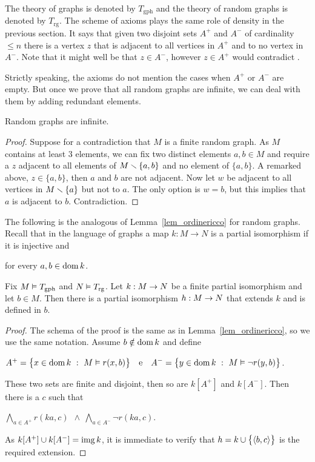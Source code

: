 \documentclass[creche.tex]{subfiles}
\begin{document}
The theory of graphs is denoted by \emph{$T_{\textrm{gph}}$} and the theory of random graphs is denoted by \emph{$T_{\textrm{rg}}$}. The scheme of axioms  plays the same role of density in the previous section.  It says that given two disjoint sets $A^+$ and $A^-$ of cardinality $\le n$ there is a vertex $z$ that is adjacent to all vertices in $A^+$ and to no vertex in $A^-$. Note that it might well be that $z\in A^-$, however $z\in A^+$ would contradict . 

Strictly speaking, the axioms  do not mention the cases when $A^+$ or $A^-$ are empty. But once we prove that all random graphs are infinite, we can deal with them by adding redundant elements.

\begin{proposition}
Random graphs are infinite.
\end{proposition}
\begin{proof}
Suppose for a contradiction that $M$ is a finite random graph. As $M$ contains at least $3$ elements, we can fix two distinct elements $a,b\in M$ and require a $z$ adjacent to all elements of $M\sm\{a,b\}$ and no element of $\{a,b\}$. A remarked above, $z\in\{a,b\}$, then $a$ and $b$ are not adjacent. Now let $w$ be adjacent to all vertices in $M\sm\{a\}$ but not to $a$. The only option is $w=b$, but this implies that $a$ is adjacent to $b$. Contradiction.
\end{proof}

The following is the analogous of Lemma~\ref{lem_ordinericco} for random graphs. Recall that in the language of graphs a map $k:M\to N$ is a partial isomorphism if it is injective and

\hfill for every $a,b\in\dom k$.

\begin{lemma}\label{lem_graforicco}
Fix $M\models T_{\rm gph}$ and $N\models T_{\rm rg}$. Let $k:M\imp N$ be a finite partial isomorphism and let $b\in M$. Then there is a partial isomorphism $h:M\imp N$ that extends $k$ and is defined in $b$.
\end{lemma}
\begin{proof} The schema of the proof is the same as in Lemma~\ref{lem_ordinericco}, so we use the same notation. Assume $b\notin\dom k$ and define\medskip

\hfil$A^+=\big\{x\in\dom k\ :\ M\models r(x,b)\big\}\ \ \ \textrm{e}\ \ \ A^-=\big\{y\in\dom k\ :\  M\models \neg r(y,b)\big\}$.\medskip

These two sets are finite and disjoint, then so are $k[A^+]$ and $k[A^-]$. Then there is a $c$ such that\medskip

\hfil$\displaystyle\bigwedge_{a\in A^+}r(ka,c)\ \ \wedge\ \bigwedge_{a\in A^-}\neg r(ka,c)$.

As $k[A^+]\cup k[A^-]=\range k$, it is immediate to verify that $h=k\cup\big\{\<b,c\>\big\}$ is the required extension.
\end{proof}
\end{document}

